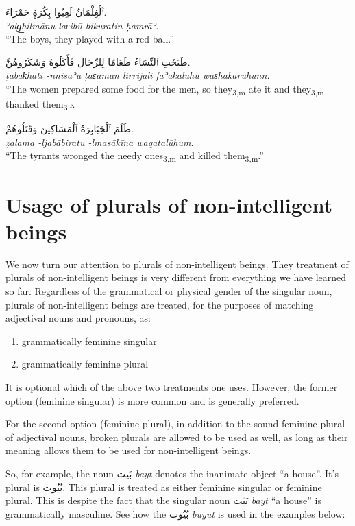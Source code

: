 \documentclass[
  10pt,
]{book}
\providecommand{\tightlist}{%
  \setlength{\itemsep}{0pt}\setlength{\parskip}{0pt}}
\begin{document}
\foreignlanguage{arabic}{ٱَلْغِلْمَانُ لَعِبُوا بِکُرَةٍ حَمْرَاءَ.}\\
\emph{ʾalg͟hilmānu laɛibū bikuratin ḥamrāʾ.}\\
\enquote{The boys, they played with a red ball.}

\foreignlanguage{arabic}{طَبَخَتِ ٱلنِّسَاءُ طَعَامًا لِلرِّجَال فَأَکَلُوهُ وَشَکَرُوهُنَّ.}\\
\emph{ṭabak͟hati -nnisāʾu ṭaɛāman lirrijāli faʾakalūhu was͟hakarūhunn.}\\
``The women prepared some food for the men, so they\textsubscript{3,m} ate it and they\textsubscript{3,m} thanked them\textsubscript{3,f}.

\foreignlanguage{arabic}{ظَلَمَ ٱلْجَبَابِرَةُ ٱلْمَسَاکِينَ وَقَتَلُوهُمْ.}\\
\emph{ẓalama -ljabābiratu -lmasākīna waqatalūhum.}\\
\enquote{The tyrants wronged the needy ones\textsubscript{3,m} and killed them\textsubscript{3,m}.}

\section{Usage of plurals of non-intelligent beings}\label{usage-of-plurals-of-non-intelligent-beings}

We now turn our attention to plurals of non-intelligent beings. They treatment of plurals of non-intelligent beings is very different from everything we have learned so far. Regardless of the grammatical or physical gender of the singular noun, plurals of non-intelligent beings are treated, for the purposes of matching adjectival nouns and pronouns, as:

\begin{enumerate}
\def\labelenumi{\roman{enumi}.}
\tightlist
\item
  grammatically feminine singular
\item
  grammatically feminine plural
\end{enumerate}

It is optional which of the above two treatments one uses. However, the former option (feminine singular) is more common and is generally preferred.

For the second option (feminine plural), in addition to the sound feminine plural of adjectival nouns, broken plurals are allowed to be used as well, as long as their meaning allows them to be used for non-intelligent beings.

So, for example, the noun \foreignlanguage{arabic}{بَيت} \emph{bayt} denotes the inanimate object \enquote{a house}. It's plural is \foreignlanguage{arabic}{بُيُوت}. This plural is treated as either feminine singular or feminine plural. This is despite the fact that the singular noun \foreignlanguage{arabic}{بَيْت} \emph{bayt} \enquote{a house} is grammatically masculine. See how the \foreignlanguage{arabic}{بُيُوت} \emph{buyūt} is used in the examples below:
\end{document}
